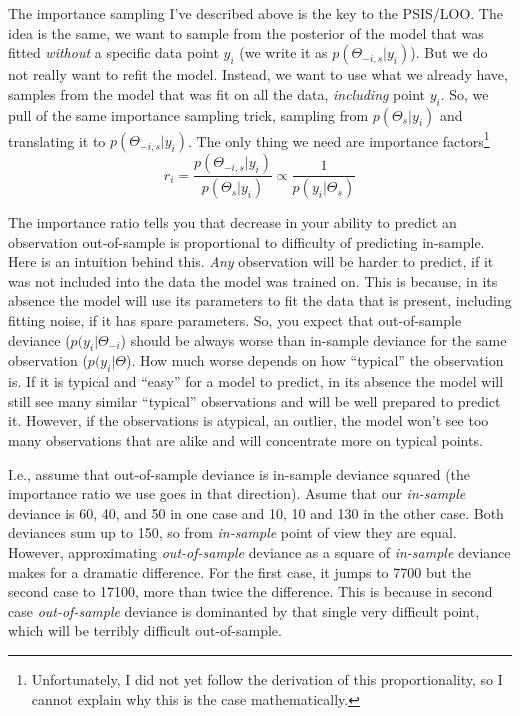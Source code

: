 \documentclass[
]{book}
\begin{document}
The importance sampling I've described above is the key to the PSIS/LOO. The idea is the same, we want to sample from the posterior of the model that was fitted \emph{without} a specific data point \(y_i\) (we write it as \(p(\Theta_{-i,s}|y_i)\)). But we do not really want to refit the model. Instead, we want to use what we already have, samples from the model that was fit on all the data, \emph{including} point \(y_i\). So, we pull of the same importance sampling trick, sampling from \(p(\Theta_s|y_i)\) and translating it to \(p(\Theta_{-i,s}|y_i)\). The only thing we need are importance factors\footnote{Unfortunately, I did not yet follow the derivation of this proportionality, so I cannot explain why this is the case mathematically.}
\[r_i = \frac{p(\Theta_{-i,s}|y_i)}{p(\Theta_s|y_i)} \propto \frac{1}{p(y_i|\Theta_s)}\]

The importance ratio tells you that decrease in your ability to predict an observation out-of-sample is proportional to difficulty of predicting in-sample. Here is an intuition behind this. \emph{Any} observation will be harder to predict, if it was not included into the data the model was trained on. This is because, in its absence the model will use its parameters to fit the data that is present, including fitting noise, if it has spare parameters. So, you expect that out-of-sample deviance (\(p(y_i|\Theta_{-i}\)) should be always worse than in-sample deviance for the same observation (\(p(y_i|\Theta\)). How much worse depends on how ``typical'' the observation is. If it is typical and ``easy'' for a model to predict, in its absence the model will still see many similar ``typical'' observations and will be well prepared to predict it. However, if the observations is atypical, an outlier, the model won't see too many observations that are alike and will concentrate more on typical points.

I.e., assume that out-of-sample deviance is in-sample deviance squared (the importance ratio we use goes in that direction). Asume that our \emph{in-sample} deviance is 60, 40, and 50 in one case and 10, 10 and 130 in the other case. Both deviances sum up to 150, so from \emph{in-sample} point of view they are equal. However, approximating \emph{out-of-sample} deviance as a square of \emph{in-sample} deviance makes for a dramatic difference. For the first case, it jumps to 7700 but the second case to 17100, more than twice the difference. This is because in second case \emph{out-of-sample} deviance is dominanted by that single very difficult point, which will be terribly difficult out-of-sample.
\end{document}
